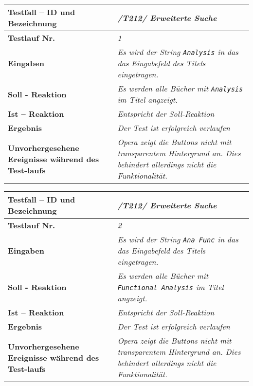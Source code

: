\begin{longtable}{|p{5cm}|p{10cm}|}
\hline
\textbf{Testfall -- ID und Bezeichnung} & \textit{/T212/ Erweiterte
Suche} \\
\hline
\textbf{Testlauf Nr.} & \textit{1} \\
\hline
\textbf{Eingaben} & \textit{Es wird der String \lstinline{Analysis} in das
das Eingabefeld des Titels eingetragen.} \\
\hline
\textbf{Soll - Reaktion} & \textit{Es werden alle Bücher mit
\lstinline{Analysis} im Titel angzeigt.
} \\
\hline
\textbf{Ist -- Reaktion} & \textit{Entspricht der Soll-Reaktion} \\
\hline
\textbf{Ergebnis} & \textit{Der Test ist erfolgreich verlaufen} \\
\hline
\textbf{Unvorhergesehene Ereignisse w\"ahrend des Test-laufs } &
\textit{Opera zeigt die Buttons nicht mit transparentem Hintergrund an. Dies
behindert allerdings nicht die Funktionalität.} \\
\hline
\end{longtable}

\begin{longtable}{|p{5cm}|p{10cm}|}
\hline
\textbf{Testfall -- ID und Bezeichnung} & \textit{/T212/ Erweiterte
Suche} \\
\hline
\textbf{Testlauf Nr.} & \textit{2} \\
\hline
\textbf{Eingaben} & \textit{Es wird der String \lstinline{Ana Func} in das
das Eingabefeld des Titels eingetragen.} \\
\hline
\textbf{Soll - Reaktion} & \textit{Es werden alle Bücher mit
\lstinline{Functional Analysis} im Titel angzeigt.
} \\
\hline
\textbf{Ist -- Reaktion} & \textit{Entspricht der Soll-Reaktion} \\
\hline
\textbf{Ergebnis} & \textit{Der Test ist erfolgreich verlaufen} \\
\hline
\textbf{Unvorhergesehene Ereignisse w\"ahrend des Test-laufs } &
\textit{Opera zeigt die Buttons nicht mit transparentem Hintergrund an. Dies
behindert allerdings nicht die Funktionalität.} \\
\hline
\end{longtable}

